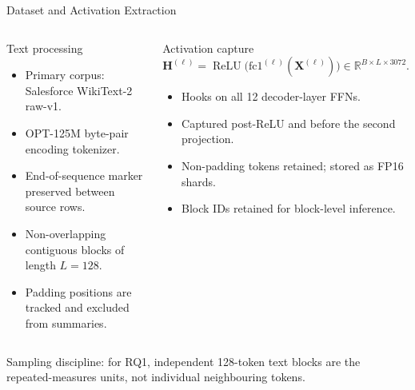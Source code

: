 \documentclass[aspectratio=169,10pt]{beamer}
\newcommand{\smallnote}[1]{{\scriptsize\color{Muted}#1}}
\newcommand{\ReLU}{\operatorname{ReLU}}
\newcommand{\R}{\mathbb{R}}
\begin{document}
\begin{frame}{Dataset and Activation Extraction}
\begin{columns}[T,onlytextwidth]
\begin{block}{Text processing}
\begin{itemize}
  \item Primary corpus: Salesforce WikiText-2 raw-v1.
  \item OPT-125M byte-pair encoding tokenizer.
  \item End-of-sequence marker preserved between source rows.
  \item Non-overlapping contiguous blocks of length $L=128$.
  \item Padding positions are tracked and excluded from summaries.
\end{itemize}
\end{block}
\begin{block}{Activation capture}
\begin{equation}
\mathbf{H}^{(\ell)}=\ReLU\!\bigl(\mathrm{fc1}^{(\ell)}(\mathbf{X}^{(\ell)})\bigr)
\in\R^{B\times L\times 3072}.
\label{eq:capture}
\end{equation}
\begin{itemize}
  \item Hooks on all 12 decoder-layer FFNs.
  \item Captured post-ReLU and before the second projection.
  \item Non-padding tokens retained; stored as FP16 shards.
  \item Block IDs retained for block-level inference.
\end{itemize}
\end{block}
\end{columns}
\vspace{2pt}
\smallnote{Sampling discipline: for RQ1, independent 128-token text blocks are the repeated-measures units, not individual neighbouring tokens.}
\end{frame}
\end{document}
